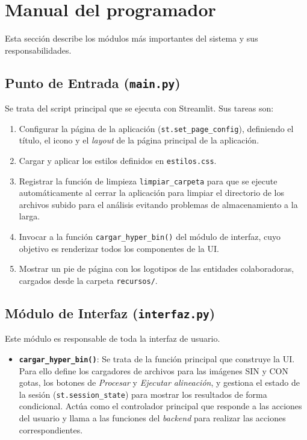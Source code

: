 \section{Manual del programador}
Esta sección describe los módulos más importantes del sistema y sus responsabilidades.

\subsection{Punto de Entrada (\texttt{main.py})}
Se trata del script principal que se ejecuta con Streamlit. Sus tareas son:
\begin{enumerate}
 \item Configurar la página de la aplicación (\verb|st.set_page_config|), definiendo el título, el icono y el \textit{layout} de la página principal de la aplicación.
\item Cargar y aplicar los estilos definidos en \texttt{estilos.css}.
 \item Registrar la función de limpieza \verb|limpiar_carpeta| para que se ejecute automáticamente al cerrar la aplicación para limpiar el directorio de los archivos subido para el análisis evitando problemas de almacenamiento a la larga.
\item Invocar a la función \verb|cargar_hyper_bin()| del módulo de interfaz, cuyo objetivo es renderizar todos los componentes de la UI.
 \item Mostrar un pie de página con los logotipos de las entidades colaboradoras, cargados desde la carpeta \texttt{recursos/}.
\end{enumerate}

\subsection{Módulo de Interfaz (\texttt{interfaz.py})}
Este módulo es responsable de toda la interfaz de usuario.
\begin{itemize}
 \item \textbf{\texttt{cargar\_hyper\_bin()}}: Se trata de la función principal que construye la UI. Para ello define los cargadores de archivos para las imágenes SIN y CON gotas, los botones de \textit{Procesar} y \textit{Ejecutar alineación}, y gestiona el estado de la sesión (\verb|st.session_state|) para mostrar los resultados de forma condicional. Actúa como el controlador principal que responde a las acciones del usuario y llama a las funciones del \textit{backend} para realizar las acciones correspondientes.
\end{itemize}

